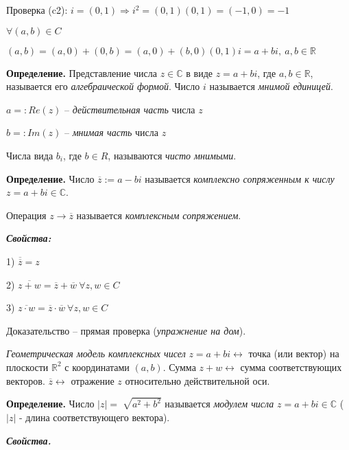 \vspace{\baselineskip}
Проверка (c2): $i = (0, 1) \Rightarrow i^2 = (0, 1)(0, 1) = (-1, 0) = -1$

$\forall (a, b) \in C$

$(a, b) = (a, 0) + (0, b) = (a, 0) + (b, 0) (0, 1) i = a + bi, \ a, b \in \mathbb{R}$

\vspace{\baselineskip}
\textbf{Определение.} Представление числа $z \in \mathbb{C}$ в виде  $z = a + bi$, где $a, b \in \mathbb{R}$, называется его \textit{алгебраической формой}. Число $i$ называется \textit{мнимой единицей}.

$a =: Re(z)$ -- \textit{действительная часть} числа $z$

$b =: Im(z)$ -- \textit{мнимая часть} числа $z$

\vspace{\baselineskip}
Числа вида $b_i$, где $b \in R$, называются \textit{чисто мнимыми}.

\vspace{\baselineskip}
\textbf{Определение.} Число $\overline{z} := a - bi$ называется \textit{комплексно сопряженным к числу} $z=a+bi \in \mathbb{C}$.

Операция $z \rightarrow \overline{z}$ называется \textit{комплексным сопряжением}.

\vspace{\baselineskip}
\textbf{\textit{Свойства:}}

1) $\overline{\overline{z}} = z$

2) $\overline{z + w} = \overline{z} + \overline{w} \ \forall z, w \in C$

3) $\overline{z \cdot w} = \overline{z} \cdot \overline{w} \ \forall z, w \in C$

Доказательство -- прямая проверка (\textit{упражнение на дом}).

\vspace{\baselineskip}
\textit{Геометрическая модель комплексных чисел} $z = a + bi \leftrightarrow$ точка (или вектор) на плоскости $\mathbb{R}^2$ с координатами $(a, b)$. Сумма $z + w \leftrightarrow$ сумма соответствующих векторов. $\overline{z} \leftrightarrow$ отражение $z$ относительно действительной оси.

\vspace{\baselineskip}
\textbf{Определение.} Число $|z| = \sqrt[]{a^2 + b^2}$ называется \textit{модулем числа} $z = a + bi \in \mathbb{C}$ ($|z|$ - длина соответствующего вектора).

\vspace{\baselineskip}
\textbf{\textit{Свойства.}} 

